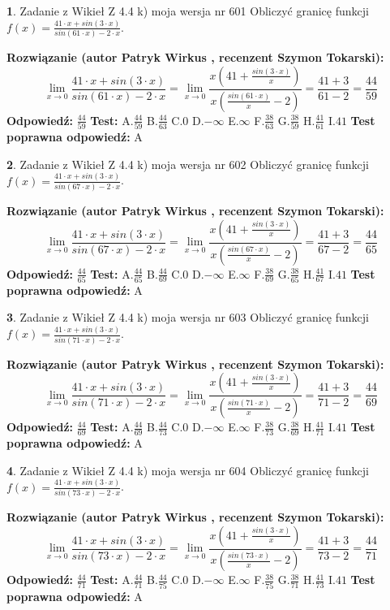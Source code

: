 \documentclass[12pt, a4paper]{article}
\theoremstyle{definition} %
\newtheorem{zad}{}
\newcommand{\zadStart}[1]{\begin{zad}#1\newline}
\newcommand{\zadStop}{\end{zad}}
\newcommand{\rozwStart}[2]{\noindent \textbf{Rozwiązanie (autor #1 , recenzent #2): }\newline}
\newcommand{\rozwStop}{\newline}
\newcommand{\odpStart}{\noindent \textbf{Odpowiedź:}\newline}
\newcommand{\odpStop}{\newline}
\newcommand{\testStart}{\noindent \textbf{Test:}\newline}
\newcommand{\testStop}{\newline}
\newcommand{\kluczStart}{\noindent \textbf{Test poprawna odpowiedź:}\newline}
\newcommand{\kluczStop}{\newline}
\begin{document}
\zadStart{Zadanie z Wikieł Z 4.4 k) moja wersja nr 601}
Obliczyć granicę funkcji $f(x)=\frac{41\cdot x +sin(3\cdot x)}{sin(61\cdot x) -2\cdot x}$.
\zadStop
\rozwStart{Patryk Wirkus}{Szymon Tokarski}
$$\lim\limits_{x\to 0}\frac{41\cdot x +sin(3\cdot x)}{sin(61\cdot x) -2\cdot x}
=\lim\limits_{x\to 0}\frac{x(41+\frac{sin(3\cdot x)}{x})}{x(\frac{sin(61\cdot x)}{x}-2)}
=\frac{41+3}{61-2} = \frac{44}{59}$$
\rozwStop
\odpStart
$\frac{44}{59}$
\odpStop
\testStart
A.$\frac{44}{59}$
B.$\frac{44}{63}$
C.$0$
D.$-\infty$
E.$\infty$
F.$\frac{38}{63}$
G.$\frac{38}{59}$
H.$\frac{41}{61}$
I.$41$
\testStop
\kluczStart
A
\kluczStop



\zadStart{Zadanie z Wikieł Z 4.4 k) moja wersja nr 602}
Obliczyć granicę funkcji $f(x)=\frac{41\cdot x +sin(3\cdot x)}{sin(67\cdot x) -2\cdot x}$.
\zadStop
\rozwStart{Patryk Wirkus}{Szymon Tokarski}
$$\lim\limits_{x\to 0}\frac{41\cdot x +sin(3\cdot x)}{sin(67\cdot x) -2\cdot x}
=\lim\limits_{x\to 0}\frac{x(41+\frac{sin(3\cdot x)}{x})}{x(\frac{sin(67\cdot x)}{x}-2)}
=\frac{41+3}{67-2} = \frac{44}{65}$$
\rozwStop
\odpStart
$\frac{44}{65}$
\odpStop
\testStart
A.$\frac{44}{65}$
B.$\frac{44}{69}$
C.$0$
D.$-\infty$
E.$\infty$
F.$\frac{38}{69}$
G.$\frac{38}{65}$
H.$\frac{41}{67}$
I.$41$
\testStop
\kluczStart
A
\kluczStop



\zadStart{Zadanie z Wikieł Z 4.4 k) moja wersja nr 603}
Obliczyć granicę funkcji $f(x)=\frac{41\cdot x +sin(3\cdot x)}{sin(71\cdot x) -2\cdot x}$.
\zadStop
\rozwStart{Patryk Wirkus}{Szymon Tokarski}
$$\lim\limits_{x\to 0}\frac{41\cdot x +sin(3\cdot x)}{sin(71\cdot x) -2\cdot x}
=\lim\limits_{x\to 0}\frac{x(41+\frac{sin(3\cdot x)}{x})}{x(\frac{sin(71\cdot x)}{x}-2)}
=\frac{41+3}{71-2} = \frac{44}{69}$$
\rozwStop
\odpStart
$\frac{44}{69}$
\odpStop
\testStart
A.$\frac{44}{69}$
B.$\frac{44}{73}$
C.$0$
D.$-\infty$
E.$\infty$
F.$\frac{38}{73}$
G.$\frac{38}{69}$
H.$\frac{41}{71}$
I.$41$
\testStop
\kluczStart
A
\kluczStop



\zadStart{Zadanie z Wikieł Z 4.4 k) moja wersja nr 604}
Obliczyć granicę funkcji $f(x)=\frac{41\cdot x +sin(3\cdot x)}{sin(73\cdot x) -2\cdot x}$.
\zadStop
\rozwStart{Patryk Wirkus}{Szymon Tokarski}
$$\lim\limits_{x\to 0}\frac{41\cdot x +sin(3\cdot x)}{sin(73\cdot x) -2\cdot x}
=\lim\limits_{x\to 0}\frac{x(41+\frac{sin(3\cdot x)}{x})}{x(\frac{sin(73\cdot x)}{x}-2)}
=\frac{41+3}{73-2} = \frac{44}{71}$$
\rozwStop
\odpStart
$\frac{44}{71}$
\odpStop
\testStart
A.$\frac{44}{71}$
B.$\frac{44}{75}$
C.$0$
D.$-\infty$
E.$\infty$
F.$\frac{38}{75}$
G.$\frac{38}{71}$
H.$\frac{41}{73}$
I.$41$
\testStop
\kluczStart
A
\kluczStop
\end{document}
